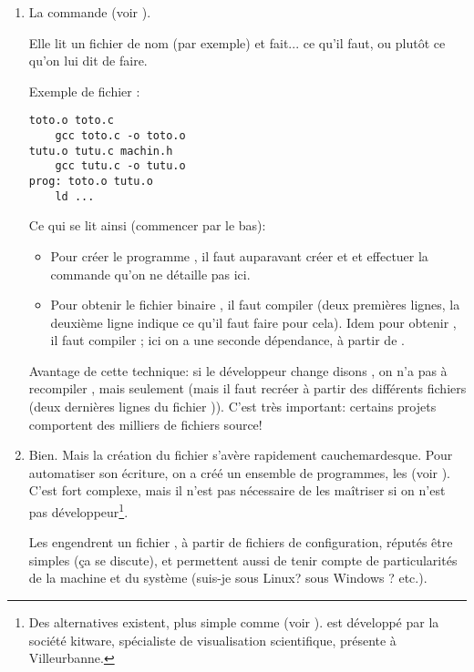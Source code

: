 \begin{enumerate}
\item La commande  (voir \cite{make}).

  Elle lit un fichier de nom  (par exemple) et fait... ce
  qu'il faut, ou plutôt ce qu'on lui dit de faire.

  Exemple de fichier :
\begin{verbatim}
toto.o toto.c
    gcc toto.c -o toto.o
tutu.o tutu.c machin.h
    gcc tutu.c -o tutu.o
prog: toto.o tutu.o
    ld ...
\end{verbatim}
Ce qui se lit ainsi (commencer par le bas):
\begin{itemize}
\item Pour créer le programme , il faut auparavant créer
   et  et effectuer la commande  qu'on
  ne détaille pas ici.
  \item Pour obtenir le fichier binaire , il faut compiler
     (deux premières lignes, la deuxième ligne indique ce
    qu'il faut faire pour cela). Idem pour obtenir
    , il faut compiler ; ici on a une
    seconde dépendance, à partir de  .
\end{itemize}
Avantage de cette technique: si le développeur change disons
, on n'a pas à recompiler , mais seulement
  (mais il faut
recréer  à partir des différents fichiers  (deux
dernières lignes du fichier )). C'est
très important: certains projets comportent des milliers de fichiers
source!
\item Bien. Mais la création du fichier  s'avère
  rapidement cauchemardesque. Pour automatiser son écriture, on a créé
  un ensemble de programmes, les  (voir
  \cite{autotools}). C'est fort complexe, mais il n'est pas nécessaire
  de les maîtriser si on n'est pas développeur\footnote{Des
    alternatives existent, plus simple comme  (voir
    \cite{cmake}).
      est développé par la société kitware, spécialiste de
     visualisation scientifique, présente à Villeurbanne.}.

  Les    engendrent un fichier , à partir
  de fichiers de configuration, réputés être simples (ça se discute),
  et permettent aussi de tenir compte de particularités de la machine
  et du système (suis-je sous Linux? sous Windows ? etc.).

  

\end{enumerate}
